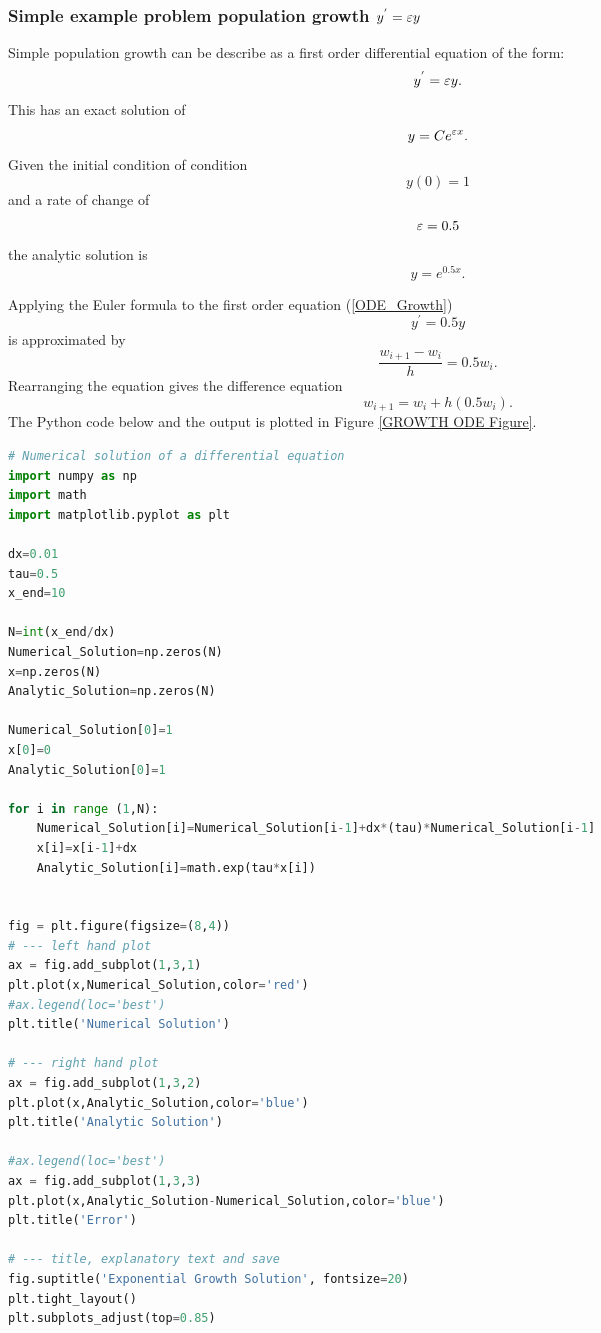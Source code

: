 \subsubsection{Simple example problem population growth $y^{'}=\varepsilon y $ }

\begin{example}
Simple population growth can be describe as a first order differential equation of the form: \begin{equation}\label{ODE_Growth} y^{'}=\varepsilon y. \end{equation}
This has an exact solution of 
\[ y=Ce^{\varepsilon x}. \]
Given the initial condition of  condition
\[y(0)=1\]
and a rate of change of
\[ \varepsilon=0.5\]
the analytic solution is
\[ y=e^{0.5x}.\]

\end{example}

\begin{example} Applying the Euler formula to the first order equation
(\ref{ODE_Growth})
\[ y^{'} = 0.5y \]
is approximated by
\[\frac{w_{i+1}-w_i}{h}=0.5w_i. \]
Rearranging the equation gives the difference equation
\[w_{i+1}=w_i+h(0.5w_i). \]
The Python code below and the output is plotted in Figure \ref{GROWTH ODE Figure}.
\end{example}

\begin{lstlisting}[language=Python, caption=Python Numerical and Analytical Solution of Eqn \ref{ODE_Growth} ]
# Numerical solution of a differential equation
import numpy as np
import math 
import matplotlib.pyplot as plt

dx=0.01
tau=0.5
x_end=10

N=int(x_end/dx)
Numerical_Solution=np.zeros(N)
x=np.zeros(N)
Analytic_Solution=np.zeros(N)

Numerical_Solution[0]=1
x[0]=0
Analytic_Solution[0]=1

for i in range (1,N):
    Numerical_Solution[i]=Numerical_Solution[i-1]+dx*(tau)*Numerical_Solution[i-1]
    x[i]=x[i-1]+dx
    Analytic_Solution[i]=math.exp(tau*x[i])


fig = plt.figure(figsize=(8,4))
# --- left hand plot
ax = fig.add_subplot(1,3,1)
plt.plot(x,Numerical_Solution,color='red')
#ax.legend(loc='best')
plt.title('Numerical Solution')

# --- right hand plot
ax = fig.add_subplot(1,3,2)
plt.plot(x,Analytic_Solution,color='blue')
plt.title('Analytic Solution')

#ax.legend(loc='best')
ax = fig.add_subplot(1,3,3)
plt.plot(x,Analytic_Solution-Numerical_Solution,color='blue')
plt.title('Error')

# --- title, explanatory text and save
fig.suptitle('Exponential Growth Solution', fontsize=20)
plt.tight_layout()
plt.subplots_adjust(top=0.85)
\end{lstlisting}

